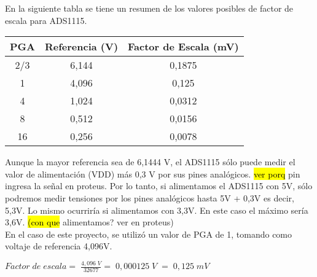 En la siguiente tabla se tiene un resumen de los valores posibles de factor de escala para ADS1115.
\begin{table}[h]
	\centering
	\begin{tabular}{|c|c|c|}
	\hline
	\textbf{PGA} & \textbf{Referencia (V)} & \textbf{Factor de Escala (mV)} \\ \hline
	2/3 & 6,144 & 0,1875 \\ \hline
	1 & 4,096 & 0,125 \\ \hline
	4 & 1,024 & 0,0312 \\ \hline
	8 & 0,512 & 0,0156 \\ \hline
	16 & 0,256 & 0,0078 \\ \hline
	\end{tabular}
	\end{table}

	Aunque la mayor referencia sea de 6,1444 V, el ADS1115 sólo puede medir el valor de alimentación (VDD) más 0,3 V por sus pines analógicos. \hl{ver porq} pin ingresa la señal en proteus. Por lo tanto, si alimentamos el ADS1115 con 5V, sólo podremos medir tensiones por los pines analógicos hasta 5V + 0,3V es decir, 5,3V. Lo mismo ocurriría si alimentamos con 3,3V. En este caso el máximo sería 3,6V. \hl{(con que} alimentamos? ver en proteus)\\
	En el caso de este proyecto, se utilizó un valor de PGA de 1, tomando como voltaje de referencia 4,096V.
\begin{center}
	\begin{math}
Factor\;de\;escala=\;\frac{4,096\;V}{32677}=\;0,000125\;V\;=\;0,125\;mV
	\end{math}
\end{center}

